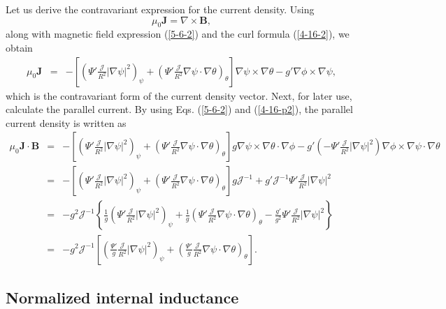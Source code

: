 \documentclass{llncs}
\begin{document}
Let us derive the contravariant expression for the current density. Using
\[ \mu_0 \mathbf{J}= \nabla \times \mathbf{B}, \]
along with magnetic field expression (\ref{5-6-2}) and the curl formula
(\ref{4-16-2}), we obtain
\begin{eqnarray}
  \mu_0 \mathbf{J} & = & - \left[ \left( \Psi' \frac{\mathcal{J}}{R^2} |
  \nabla \psi |^2 \right)_{\psi} + \left( \Psi' \frac{\mathcal{J}}{R^2} \nabla
  \psi \cdot \nabla \theta \right)_{\theta} \right] \nabla \psi \times \nabla
  \theta - g' \nabla \phi \times \nabla \psi,  \label{4-16-p2}
\end{eqnarray}
which is the contravariant form of the current density vector. Next, for later
use, calculate the parallel current. By using Eqs. (\ref{5-6-2}) and
(\ref{4-16-p2}), the parallel current density is written as
\begin{eqnarray}
  \mu_0 \mathbf{J} \cdot \mathbf{B} & = & - \left[ \left( \Psi'
  \frac{\mathcal{J}}{R^2} | \nabla \psi |^2 \right)_{\psi} + \left( \Psi'
  \frac{\mathcal{J}}{R^2} \nabla \psi \cdot \nabla \theta \right)_{\theta}
  \right] g \nabla \psi \times \nabla \theta \cdot \nabla \phi - g' \left( -
  \Psi' \frac{\mathcal{J}}{R^2} | \nabla \psi |^2 \right) \nabla \phi \times
  \nabla \psi \cdot \nabla \theta \nonumber\\
  & = & - \left[ \left( \Psi' \frac{\mathcal{J}}{R^2} | \nabla \psi |^2
  \right)_{\psi} + \left( \Psi' \frac{\mathcal{J}}{R^2} \nabla \psi \cdot
  \nabla \theta \right)_{\theta} \right] g\mathcal{J}^{- 1} + g'
  \mathcal{J}^{- 1} \Psi' \frac{\mathcal{J}}{R^2} | \nabla \psi |^2
  \nonumber\\
  & = & - g^2 \mathcal{J}^{- 1} \left\{ \frac{1}{g} \left( \Psi'
  \frac{\mathcal{J}}{R^2} | \nabla \psi |^2 \right)_{\psi} + \frac{1}{g}
  \left( \Psi' \frac{\mathcal{J}}{R^2} \nabla \psi \cdot \nabla \theta
  \right)_{\theta} - \frac{g'}{g^2} \Psi' \frac{\mathcal{J}}{R^2} | \nabla
  \psi |^2 \right\} \nonumber\\
  & = & - g^2 \mathcal{J}^{- 1} \left[ \left( \frac{\Psi'}{g}
  \frac{\mathcal{J}}{R^2} | \nabla \psi |^2 \right)_{\psi} + \left(
  \frac{\Psi'}{g} \frac{\mathcal{J}}{R^2} \nabla \psi \cdot \nabla \theta
  \right)_{\theta} \right] . 
\end{eqnarray}

\subsection{Normalized internal inductance}
\end{document}
